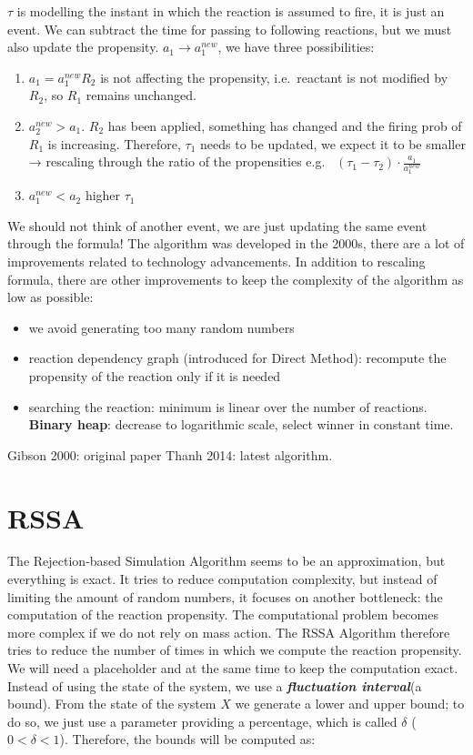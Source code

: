 $\tau$ is modelling the instant in which the reaction is assumed to fire, it is just an event.
We can subtract the time for passing to following reactions, but we must also update the propensity.
$a_1 \rightarrow a_1^{new}$, we have three possibilities:

\begin{enumerate}
  \def\labelenumi{\arabic{enumi}.}
  \item $a_1 = a_1^{new}$$R_2$ is not affecting the propensity, i.e.~reactant is not modified by $R_2$, so $R_1$ remains unchanged.
  \item $a_2^{new}> a_1$. $R_2$ has been applied, something has changed and the firing prob of $R_1$ is increasing.
    Therefore, $\tau_1$ needs to be updated, we expect it to be smaller → rescaling through the ratio of the propensities e.g. ~$(\tau_1-\tau_2) \cdot \frac{a_1}{a_1^{new}}$ \item $a_1^{new}< a_2$ higher $\tau_1$
\end{enumerate}

We should not think of another event, we are just updating the same event through the formula! The algorithm was developed in the 2000s, there are a lot of improvements related to technology advancements.
In addition to rescaling formula, there are other improvements to keep the complexity of the algorithm as low as possible:

\begin{itemize}
  \item we avoid generating too many random numbers
  \item reaction dependency graph (introduced for Direct Method): recompute the propensity of the reaction only if it is needed
  \item searching the reaction: minimum is linear over the number of reactions.
    \textbf{Binary heap}: decrease to logarithmic scale, select winner in constant time.
\end{itemize}

Gibson 2000: original paper Thanh 2014: latest algorithm.

\section{RSSA}
The Rejection-based Simulation Algorithm seems to be an approximation, but everything is exact.
It tries to reduce computation complexity, but instead of limiting the amount of random numbers, it focuses on another bottleneck: the computation of the reaction propensity.
The computational problem becomes more complex if we do not rely on mass action.
The RSSA Algorithm therefore tries to reduce the number of times in which we compute the reaction propensity.
We will need a placeholder and at the same time to keep the computation exact.
Instead of using the state of the system, we use a \textbf{\emph{fluctuation interval}}(a bound).
From the state of the system $X$ we generate a lower and upper bound; to do so, we just use a parameter providing a percentage, which is called $\delta$ ($0<\delta<1$).
Therefore, the bounds will be computed as:

